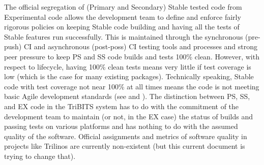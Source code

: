 \documentclass[11pt]{SANDreport}
\begin{document}
The official segregation of (Primary and Secondary) Stable tested code from Experimental code allows the development team to define and enforce fairly rigorous policies on keeping Stable code building and having all the tests of Stable features run successfully.  This is maintained through the synchronous (pre-push) CI and asynchronous (post-poss) CI testing tools and processes and strong peer pressure to keep PS and SS code builds and tests 100\% clean.  However, with respect to lifecycle, having 100\% clean tests means very little if test coverage is low (which is the case for many existing packages). Technically speaking, Stable code with test coverage not near 100\% at all times means the code is not meeting basic Agile development standards (see {}\cite{XP2} and {}\cite{CodeComplete2nd04}).  The distinction between PS, SS, and EX code in the TriBITS system has to do with the commitment of the development team to maintain (or not, in the EX case) the status of builds and passing tests on various platforms and has nothing to do with the assumed quality of the software.  Official assignments and metrics of software quality in projects like Trilinos are currently non-existent (but this current document is trying to change that).

\begin{figure}
\begin{center}
\end{center}
\end{figure}
\end{document}
